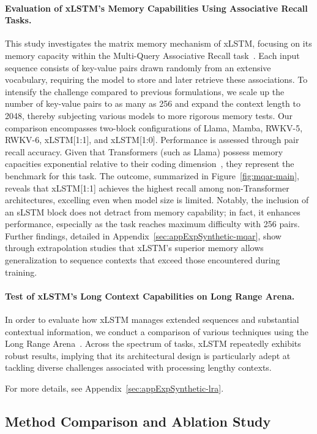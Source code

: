 \paragraph{Evaluation of xLSTM's Memory Capabilities Using Associative Recall Tasks.} This study investigates the matrix memory mechanism of xLSTM, focusing on its memory capacity within the Multi-Query Associative Recall task~\citep{Arora:23arxiv}. Each input sequence consists of key-value pairs drawn randomly from an extensive vocabulary, requiring the model to store and later retrieve these associations. To intensify the challenge compared to previous formulations, we scale up the number of key-value pairs to as many as 256 and expand the context length to 2048, thereby subjecting various models to more rigorous memory tests. Our comparison encompasses two-block configurations of Llama, Mamba, RWKV-5, RWKV-6, xLSTM[1:1], and xLSTM[1:0]. Performance is assessed through pair recall accuracy. Given that Transformers (such as Llama) possess memory capacities exponential relative to their coding dimension~\citep{Ramsauer:21}, they represent the benchmark for this task. The outcome, summarized in Figure~\ref{fig:mqar-main}, reveals that xLSTM[1:1] achieves the highest recall among non-Transformer architectures, excelling even when model size is limited. Notably, the inclusion of an sLSTM block does not detract from memory capability; in fact, it enhances performance, especially as the task reaches maximum difficulty with 256 pairs. Further findings, detailed in Appendix~\ref{sec:appExpSynthetic-mqar}, show through extrapolation studies that xLSTM's superior memory allows generalization to sequence contexts that exceed those encountered during training.

\paragraph{Test of xLSTM's Long Context Capabilities on Long Range Arena.} In order to evaluate how xLSTM manages extended sequences and substantial contextual information, we conduct a comparison of various techniques using the Long Range Arena~\citep{Tay:21}. Across the spectrum of tasks, xLSTM repeatedly exhibits robust results, implying that its architectural design is particularly adept at tackling diverse challenges associated with processing lengthy contexts.

For more details, see Appendix~\ref{sec:appExpSynthetic-lra}.

\subsection{Method Comparison and Ablation Study}
\label{sec:ExpComparison}

